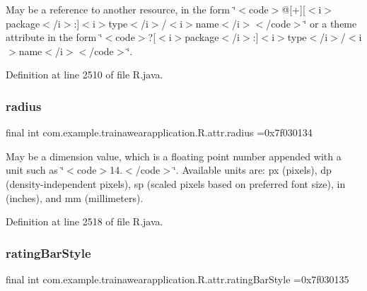 May be a reference to another resource, in the form \char`\"{}$<$code$>$@\mbox{[}+\mbox{]}\mbox{[}$<$i$>$package$<$/i$>$\+:\mbox{]}$<$i$>$type$<$/i$>$/$<$i$>$name$<$/i$>$$<$/code$>$\char`\"{} or a theme attribute in the form \char`\"{}$<$code$>$?\mbox{[}$<$i$>$package$<$/i$>$\+:\mbox{]}$<$i$>$type$<$/i$>$/$<$i$>$name$<$/i$>$$<$/code$>$\char`\"{}. 

Definition at line 2510 of file R.\+java.

\mbox{\label{classcom_1_1example_1_1trainawearapplication_1_1_r_1_1attr_a58db5dad031fefba36b1b4428ef6bbee}} 
\subsubsection{\texorpdfstring{radius}{radius}}
{\footnotesize\ttfamily final int com.\+example.\+trainawearapplication.\+R.\+attr.\+radius =0x7f030134\hspace{0.3cm}{\ttfamily [static]}}

May be a dimension value, which is a floating point number appended with a unit such as \char`\"{}$<$code$>$14.\+5sp$<$/code$>$\char`\"{}. Available units are\+: px (pixels), dp (density-\/independent pixels), sp (scaled pixels based on preferred font size), in (inches), and mm (millimeters). 

Definition at line 2518 of file R.\+java.

\mbox{\label{classcom_1_1example_1_1trainawearapplication_1_1_r_1_1attr_a34bafe392a36812de67d5c4b403f5940}} 
\subsubsection{\texorpdfstring{ratingBarStyle}{ratingBarStyle}}
{\footnotesize\ttfamily final int com.\+example.\+trainawearapplication.\+R.\+attr.\+rating\+Bar\+Style =0x7f030135\hspace{0.3cm}{\ttfamily [static]}}

